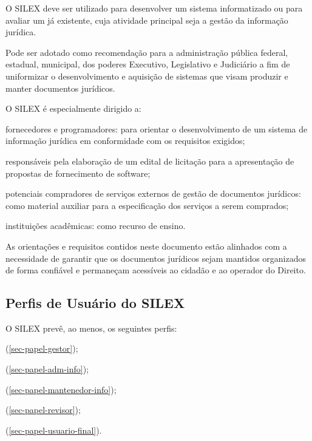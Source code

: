 \documentclass[a4paper,11pt,openright,twoside,brazil]{abntex2}
\begin{document}
O SILEX deve ser utilizado para desenvolver um sistema informatizado ou para
avaliar um já existente, cuja atividade principal seja a gestão da informação jurídica.

Pode ser adotado como recomendação para a administração pública federal,
estadual, municipal, dos poderes Executivo, Legislativo e Judiciário a fim de
uniformizar o desenvolvimento e aquisição de sistemas que visam produzir e
manter documentos jurídicos.

O SILEX é especialmente dirigido a:

\begin{alineas}
 \item fornecedores e programadores: para orientar o desenvolvimento de um
 sistema de informação jurídica em conformidade com os requisitos exigidos;
 \item responsáveis pela elaboração de um edital de licitação para a
 apresentação de propostas de fornecimento de software;
 \item potenciais compradores de serviços externos de gestão de documentos
 jurídicos: como material auxiliar para a especificação dos serviços a serem
 comprados;
 \item instituições acadêmicas: como recurso de ensino.
\end{alineas}

As orientações e requisitos contidos neste documento estão alinhados com a
necessidade de garantir que os documentos jurídicos sejam mantidos organizados
de forma confiável e permaneçam acessíveis ao cidadão e ao operador do Direito.

\subsection{Perfis de Usuário do SILEX}

O SILEX prevê, ao menos, os seguintes perfis:

\begin{alineas}
 \item {} (\autoref{sec-papel-gestor});
 \item {} (\autoref{sec-papel-adm-info});
 \item {}
 (\autoref{sec-papel-mantenedor-info});
 \item {} (\autoref{sec-papel-revisor});
 \item {} (\autoref{sec-papel-usuario-final}).
\end{alineas}
\end{document}
